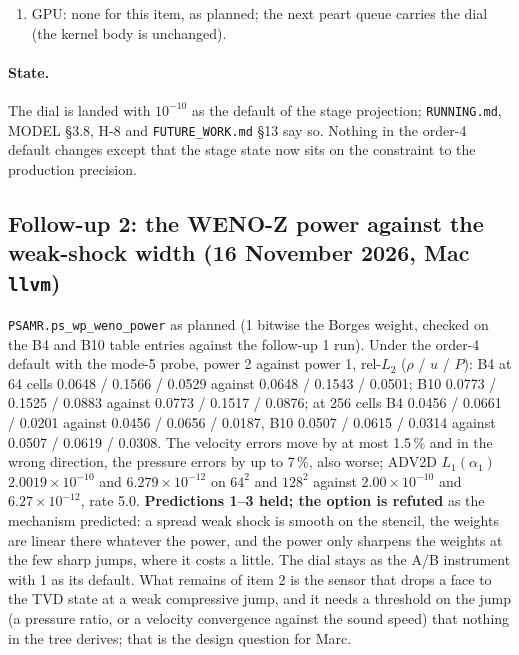 \documentclass[11pt,a4paper]{article}
\newcommand{\code}[1]{\texttt{\small #1}}
\begin{document}
\begin{enumerate}[nosep]
      the gate's PASS/FAIL set identical to Stage~4 (10 and 21), the one
      moving line the B12 mirror under mode 5 ($9.3\times10^{4}$ against
      $1.7\times10^{5}$\,Pa, mode 5's own asymmetry); the 21-case table
      within 0.2\,\% per entry (worst B7 $P$ 0.3062 to 0.3056).  demo3
      step 50: contact window $8.79\times10^{-5}$ / 1, front
      $7.76\times10^{-3}$ / 1, symmetry $1.2\times10^{-6}$\,Pa, validator
      and run clean: \textbf{held}.
\item GPU: none for this item, as planned; the next peart queue carries
      the dial (the kernel body is unchanged).
\end{enumerate}

\paragraph{State.}  The dial is landed with $10^{-10}$ as the default
of the stage projection; \code{RUNNING.md}, MODEL \S3.8, H-8 and
\code{FUTURE\_WORK.md} \S13 say so.  Nothing in the order-4 default
changes except that the stage state now sits on the constraint to the
production precision.

\subsection{Follow-up 2: the WENO-Z power against the weak-shock width (16 November 2026, Mac \code{llvm})}
\label{sec:fu2}

\code{PSAMR.ps\_wp\_weno\_power} as planned (1 bitwise the Borges
weight, checked on the B4 and B10 table entries against the follow-up 1
run).  Under the order-4 default with the mode-5 probe, power 2 against
power 1, rel-$L_2$ ($\rho$ / $u$ / $P$): B4 at 64 cells 0.0648 / 0.1566
/ 0.0529 against 0.0648 / 0.1543 / 0.0501; B10 0.0773 / 0.1525 /
0.0883 against 0.0773 / 0.1517 / 0.0876; at 256 cells B4 0.0456 /
0.0661 / 0.0201 against 0.0456 / 0.0656 / 0.0187, B10 0.0507 / 0.0615
/ 0.0314 against 0.0507 / 0.0619 / 0.0308.  The velocity errors move
by at most 1.5\,\% and in the wrong direction, the pressure errors by
up to 7\,\%, also worse; ADV2D $L_1(\alpha_1)$ $2.0019\times10^{-10}$
and $6.279\times10^{-12}$ on $64^2$ and $128^2$ against
$2.00\times10^{-10}$ and $6.27\times10^{-12}$, rate 5.0.
\textbf{Predictions 1--3 held; the option is refuted} as the mechanism
predicted: a spread weak shock is smooth on the stencil, the weights are
linear there whatever the power, and the power only sharpens the
weights at the few sharp jumps, where it costs a little.  The dial stays
as the A/B instrument with 1 as its default.  What remains of item 2 is
the sensor that drops a face to the TVD state at a weak compressive
jump, and it needs a threshold on the jump (a pressure ratio, or a
velocity convergence against the sound speed) that nothing in the tree
derives; that is the design question for Marc.
\end{document}
